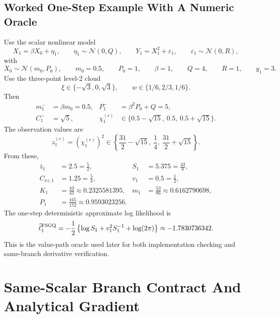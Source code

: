 \documentclass[11pt]{article}
\numberwithin{equation}{section}
\newcommand{\N}{\mathcal N}
\newcommand{\ellhat}{\widehat\ell}
\begin{document}
\subsection{Worked One-Step Example With A Numeric Oracle}
\label{sec:p32-worked-example}

Use the scalar nonlinear model
\begin{equation}
  X_1 = \beta X_0 + \eta_1,
  \qquad
  \eta_1\sim\N(0,Q),
  \qquad
  Y_1 = X_1^2 + \varepsilon_1,
  \qquad
  \varepsilon_1\sim\N(0,R),
  \label{eq:p32-example-model}
\end{equation}
with
\begin{equation}
  X_0\sim\N(m_0,P_0),
  \qquad
  m_0=0.5,
  \qquad
  P_0=1,
  \qquad
  \beta=1,
  \qquad
  Q=4,
  \qquad
  R=1,
  \qquad
  y_1=3.
  \label{eq:p32-example-params}
\end{equation}
Use the three-point level-2 cloud
\[
  \xi\in\{-\sqrt3,0,\sqrt3\},
  \qquad
  w\in\{1/6,2/3,1/6\}.
\]
Then
\begin{align}
  m_1^- &= \beta m_0 = 0.5,
  &P_1^- &= \beta^2P_0+Q = 5,\\
  C_1^- &= \sqrt5,
  &\chi_1^{(r)} &\in \{0.5-\sqrt{15},\ 0.5,\ 0.5+\sqrt{15}\}.
\end{align}
The observation values are
\begin{equation}
  z_1^{(r)} = (\chi_1^{(r)})^2
  \in
  \left\{\frac{31}{2}-\sqrt{15},\ \frac14,\ \frac{31}{2}+\sqrt{15}\right\}.
  \label{eq:p32-example-z-values}
\end{equation}
From these,
\begin{align}
  \bar z_1&=2.5=\frac52,
  &S_1&=5.375=\frac{43}{8},\\
  C_{xz,1}&=1.25=\frac54,
  &v_1&=0.5=\frac12,\\
  K_1&=\frac{10}{43}\approx 0.2325581395,
  &m_1&=\frac{53}{86}\approx0.6162790698,\\
  P_1&=\frac{165}{172}\approx0.9593023256.
  \label{eq:p32-example-moments}
\end{align}
The one-step deterministic approximate log likelihood is
\begin{equation}
  \ellhat_1^{\rm FSGQ}
  =
  -\frac12\left\{\log S_1+v_1^2S_1^{-1}+\log(2\pi)\right\}
  \approx -1.7830736342.
  \label{eq:p32-example-ell}
\end{equation}
This is the value-path oracle used later for both implementation checking and
same-branch derivative verification.

\section{Same-Scalar Branch Contract And Analytical Gradient}
\label{sec:p31-same-scalar}
\end{document}
